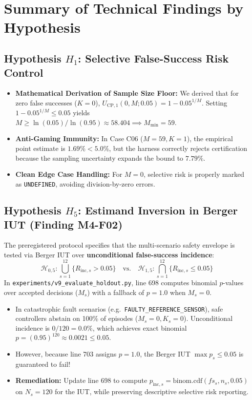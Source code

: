 \documentclass[10pt,a4paper]{article}
\begin{document}
\section{Summary of Technical Findings by Hypothesis}

\subsection{Hypothesis $H_1$: Selective False-Success Risk Control}
\begin{itemize}
    \item \textbf{Mathematical Derivation of Sample Size Floor:} We derived that for zero false successes ($K=0$), $U_{\mathrm{CP}, 1}(0, M; 0.05) = 1 - 0.05^{1/M}$. Setting $1 - 0.05^{1/M} \le 0.05$ yields $M \ge \ln(0.05)/\ln(0.95) \approx 58.404 \implies M_{\min} = 59$.
    \item \textbf{Anti-Gaming Immunity:} In Case C06 ($M = 59, K = 1$), the empirical point estimate is $1.69\% < 5.0\%$, but the harness correctly rejects certification because the sampling uncertainty expands the bound to $7.79\%$.
    \item \textbf{Clean Edge Case Handling:} For $M=0$, selective risk is properly marked as \texttt{UNDEFINED}, avoiding division-by-zero errors.
\end{itemize}

\subsection{Hypothesis $H_5$: Estimand Inversion in Berger IUT (\textbf{Finding M4-F02})}
The preregistered protocol specifies that the multi-scenario safety envelope is tested via Berger IUT over \textbf{unconditional false-success incidence}:
\begin{equation}
\mathcal{H}_{0,5}: \bigcup_{s=1}^{12} \{R_{\mathrm{inc}, s} > 0.05\} \quad\text{vs.}\quad \mathcal{H}_{1,5}: \bigcap_{s=1}^{12} \{R_{\mathrm{inc}, s} \le 0.05\}
\end{equation}
In \texttt{experiments/v9\_evaluate\_holdout.py}, line 698 computes binomial $p$-values over accepted decisions ($M_s$) with a fallback of $p=1.0$ when $M_s=0$.
\begin{itemize}
    \item In catastrophic fault scenarios (e.g.\ \texttt{FAULTY\_REFERENCE\_SENSOR}), safe controllers abstain on 100\% of episodes ($M_s=0, K_s=0$). Unconditional incidence is $0/120 = 0.0\%$, which achieves exact binomial $p = (0.95)^{120} \approx 0.0021 \le 0.05$.
    \item However, because line 703 assigns $p=1.0$, the Berger IUT $\max p_s \le 0.05$ is guaranteed to fail!
    \item \textbf{Remediation:} Update line 698 to compute $p_{\mathrm{inc}, s} = \mathrm{binom.cdf}(fs_s, n_s, 0.05)$ on $N_s=120$ for the IUT, while preserving descriptive selective risk reporting.
\end{itemize}
\end{document}
